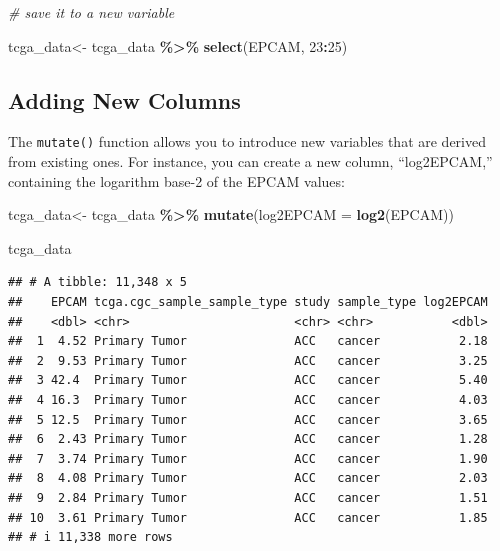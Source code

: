 \documentclass[
]{book}
\newenvironment{Shaded}{\begin{snugshade}}{\end{snugshade}}
\newcommand{\AttributeTok}[1]{\textcolor[rgb]{0.13,0.29,0.53}{#1}}
\newcommand{\CommentTok}[1]{\textcolor[rgb]{0.56,0.35,0.01}{\textit{#1}}}
\newcommand{\DecValTok}[1]{\textcolor[rgb]{0.00,0.00,0.81}{#1}}
\newcommand{\FunctionTok}[1]{\textcolor[rgb]{0.13,0.29,0.53}{\textbf{#1}}}
\newcommand{\NormalTok}[1]{#1}
\newcommand{\OtherTok}[1]{\textcolor[rgb]{0.56,0.35,0.01}{#1}}
\newcommand{\SpecialCharTok}[1]{\textcolor[rgb]{0.81,0.36,0.00}{\textbf{#1}}}
\begin{document}
\begin{Shaded}
\begin{Highlighting}[]
\CommentTok{\# save it to a new variable}

\NormalTok{tcga\_data}\OtherTok{\textless{}{-}}\NormalTok{ tcga\_data }\SpecialCharTok{\%\textgreater{}\%}
  \FunctionTok{select}\NormalTok{(EPCAM, }\DecValTok{23}\SpecialCharTok{:}\DecValTok{25}\NormalTok{)}
\end{Highlighting}
\end{Shaded}

\hypertarget{adding-new-columns}{%
\subsection{Adding New Columns}\label{adding-new-columns}}

The \texttt{mutate()} function allows you to introduce new variables that are derived from existing ones. For instance, you can create a new column, ``log2EPCAM,'' containing the logarithm base-2 of the EPCAM values:

\begin{Shaded}
\begin{Highlighting}[]
\NormalTok{tcga\_data}\OtherTok{\textless{}{-}}\NormalTok{ tcga\_data }\SpecialCharTok{\%\textgreater{}\%}
  \FunctionTok{mutate}\NormalTok{(}\AttributeTok{log2EPCAM =} \FunctionTok{log2}\NormalTok{(EPCAM))}

\NormalTok{tcga\_data}
\end{Highlighting}
\end{Shaded}

\begin{verbatim}
## # A tibble: 11,348 x 5
##    EPCAM tcga.cgc_sample_sample_type study sample_type log2EPCAM
##    <dbl> <chr>                       <chr> <chr>           <dbl>
##  1  4.52 Primary Tumor               ACC   cancer           2.18
##  2  9.53 Primary Tumor               ACC   cancer           3.25
##  3 42.4  Primary Tumor               ACC   cancer           5.40
##  4 16.3  Primary Tumor               ACC   cancer           4.03
##  5 12.5  Primary Tumor               ACC   cancer           3.65
##  6  2.43 Primary Tumor               ACC   cancer           1.28
##  7  3.74 Primary Tumor               ACC   cancer           1.90
##  8  4.08 Primary Tumor               ACC   cancer           2.03
##  9  2.84 Primary Tumor               ACC   cancer           1.51
## 10  3.61 Primary Tumor               ACC   cancer           1.85
## # i 11,338 more rows
\end{verbatim}
\end{document}
